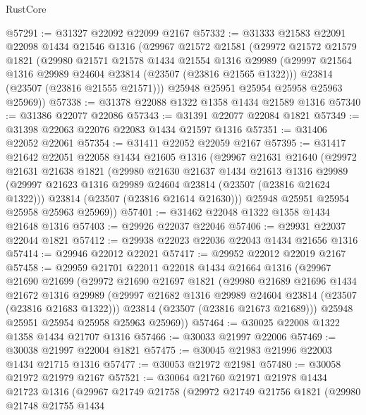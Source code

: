 \begin{lexlean}{RustCore}
\begin{coremodule}
@57291 := @31327 @22092 @22099 @2167
@57332 := @31333
    @21583
    @22091
    @22098
    @1434
    @21546
    @1316
    (@29967
      @21572
      @21581
      (@29972
        @21572
        @21579
        @1821
        (@29980
          @21571
          @21578
          @1434
          @21554
          @1316
          @29989
          (@29997 @21564 @1316 @29989 @24604 @23814 (@23507 (@23816 @21565 @1322)))
          @23814
          (@23507 (@23816 @21555 @21571)))
        @25948
        @25951
        @25954
        @25958
        @25963
        @25969))
@57338 := @31378 @22088 @1322 @1358 @1434 @21589 @1316
@57340 := @31386 @22077 @22086
@57343 := @31391 @22077 @22084 @1821
@57349 := @31398 @22063 @22076 @22083 @1434 @21597 @1316
@57351 := @31406 @22052 @22061
@57354 := @31411 @22052 @22059 @2167
@57395 := @31417
    @21642
    @22051
    @22058
    @1434
    @21605
    @1316
    (@29967
      @21631
      @21640
      (@29972
        @21631
        @21638
        @1821
        (@29980
          @21630
          @21637
          @1434
          @21613
          @1316
          @29989
          (@29997 @21623 @1316 @29989 @24604 @23814 (@23507 (@23816 @21624 @1322)))
          @23814
          (@23507 (@23816 @21614 @21630)))
        @25948
        @25951
        @25954
        @25958
        @25963
        @25969))
@57401 := @31462 @22048 @1322 @1358 @1434 @21648 @1316
@57403 := @29926 @22037 @22046
@57406 := @29931 @22037 @22044 @1821
@57412 := @29938 @22023 @22036 @22043 @1434 @21656 @1316
@57414 := @29946 @22012 @22021
@57417 := @29952 @22012 @22019 @2167
@57458 := @29959
    @21701
    @22011
    @22018
    @1434
    @21664
    @1316
    (@29967
      @21690
      @21699
      (@29972
        @21690
        @21697
        @1821
        (@29980
          @21689
          @21696
          @1434
          @21672
          @1316
          @29989
          (@29997 @21682 @1316 @29989 @24604 @23814 (@23507 (@23816 @21683 @1322)))
          @23814
          (@23507 (@23816 @21673 @21689)))
        @25948
        @25951
        @25954
        @25958
        @25963
        @25969))
@57464 := @30025 @22008 @1322 @1358 @1434 @21707 @1316
@57466 := @30033 @21997 @22006
@57469 := @30038 @21997 @22004 @1821
@57475 := @30045 @21983 @21996 @22003 @1434 @21715 @1316
@57477 := @30053 @21972 @21981
@57480 := @30058 @21972 @21979 @2167
@57521 := @30064
    @21760
    @21971
    @21978
    @1434
    @21723
    @1316
    (@29967
      @21749
      @21758
      (@29972
        @21749
        @21756
        @1821
        (@29980
          @21748
          @21755
          @1434

\end{coremodule}
\end{lexlean}
